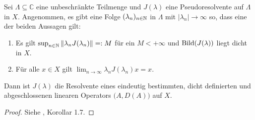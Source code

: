 \begin{folg}\label{Bedingung wenn Pseudoresolvente Resolvente ist}
Sei $\Lambda\subseteq \mathbb C$ eine unbeschränkte Teilmenge und $J(\lambda)$ eine Pseudoresolvente auf $\Lambda$ in $X$. Angenommen, es gibt eine Folge $(\lambda_n)_{n\in\mathbb{N}}$ in $\Lambda$ mit $|\lambda_n|\to\infty$ so, dass eine der beiden Aussagen gilt:
\begin{enumerate}
\item Es gilt $\sup_{n\in\mathbb{N}}\|\lambda_nJ(\lambda_n)\|=: M$ für ein $M<+\infty$ und $\textnormal{Bild}(J(\lambda))$ liegt dicht in $X$.
\item Für alle $x\in X$ gilt $\lim_{n\to\infty}\lambda_n J(\lambda_n)x=x$. 
\end{enumerate}
Dann ist $J(\lambda)$ die Resolvente eines eindeutig bestimmten, dicht definierten und abgeschlossenen linearen Operators $\big(A, D(A)\big)$ auf $X$.
\end{folg}

\begin{proof}
Siehe \cite{engel_nagel_2006}, Korollar 1.7.
\end{proof}



